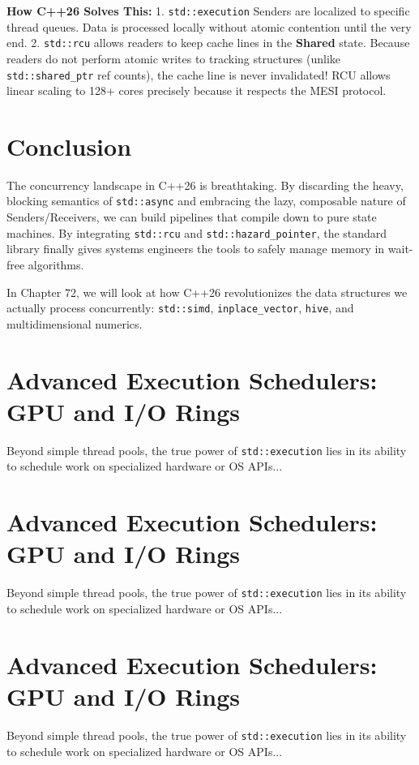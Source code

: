 \textbf{How C++26 Solves This:}
1. \texttt{std::execution} Senders are localized to specific thread queues. Data is processed locally without atomic contention until the very end.
2. \texttt{std::rcu} allows readers to keep cache lines in the \textbf{Shared} state. Because readers do not perform atomic writes to tracking structures (unlike \texttt{std::shared_ptr} ref counts), the cache line is never invalidated! RCU allows linear scaling to 128+ cores precisely because it respects the MESI protocol.

\section{Conclusion}

The concurrency landscape in C++26 is breathtaking. By discarding the heavy, blocking semantics of \texttt{std::async} and embracing the lazy, composable nature of Senders/Receivers, we can build pipelines that compile down to pure state machines. By integrating \texttt{std::rcu} and \texttt{std::hazard_pointer}, the standard library finally gives systems engineers the tools to safely manage memory in wait-free algorithms.

In Chapter 72, we will look at how C++26 revolutionizes the data structures we actually process concurrently: \texttt{std::simd}, \texttt{inplace_vector}, \texttt{hive}, and multidimensional numerics.

\section{Advanced Execution Schedulers: GPU and I/O Rings}
Beyond simple thread pools, the true power of \texttt{std::execution} lies in its ability to schedule work on specialized hardware or OS APIs...

\section{Advanced Execution Schedulers: GPU and I/O Rings}
Beyond simple thread pools, the true power of \texttt{std::execution} lies in its ability to schedule work on specialized hardware or OS APIs...

\section{Advanced Execution Schedulers: GPU and I/O Rings}
Beyond simple thread pools, the true power of \texttt{std::execution} lies in its ability to schedule work on specialized hardware or OS APIs...

